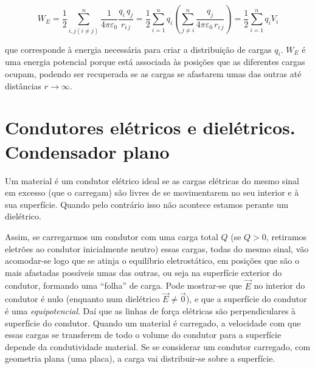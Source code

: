 \documentclass[a4paper,twoside,12pt]{article}      %
\begin{document}
\begin{equation}%
 W_E =  \frac{1}{2} \sum_{i,j (i\ne j)}^n \frac{ 1 }{4 \pi \varepsilon_0} \frac{ q_i \, q_j }{r_{i\,j}}  = 
	 \frac{1}{2} \sum_{i=1}^n q_i \left( \sum_{j \ne i}^n \frac{ q_j }{4 \pi \varepsilon_0 \,r_{i\,j}} \right) =
	\frac{1}{2} \sum_{i=1}^n q_i V_i
\end{equation}

que corresponde à energia necessária para criar a distribuição de cargas $q_i$. $W_E$ é uma energia potencial porque está associada às posições que as diferentes cargas ocupam, podendo ser recuperada se as cargas se afastarem umas das outras até distâncias $r \to \infty$.

\section{\sf Condutores elétricos e dielétricos. Condensador plano}
Um material é um condutor elétrico ideal se as cargas elétricas do mesmo sinal em excesso (que o carregam) são livres de se movimentarem no seu interior e à sua superfície. Quando pelo contrário isso não acontece estamos perante um dielétrico.

Assim, se carregarmos um condutor com uma carga total $Q$ (se $Q > 0$,  retiramos eletrões ao condutor inicialmente neutro) essas cargas, todas do mesmo sinal, vão
acomodar-se logo que se atinja o equilíbrio eletrostático, em posições que são o mais
afastadas possíveis umas das outras, ou seja na superfície exterior do condutor, formando uma ``folha'' de carga. Pode mostrar-se que $\vec{E}$ no interior do condutor é nulo (enquanto num
dielétrico $\vec{E} \ne \vec{0}$), e que a superfície do condutor é uma \emph{equipotencial}. Daí que as linhas de força elétricas são perpendiculares à superfície do condutor. Quando um material é carregado, a velocidade com que essas cargas se transferem de todo o volume do condutor para a superfície depende da condutividade material. Se se considerar um condutor carregado, com geometria plana (uma placa), a carga vai distribuir-se sobre a superfície.

\setlength{\unitlength}{0.8cm} 
\begin{center}
\end{center}
\end{document}
